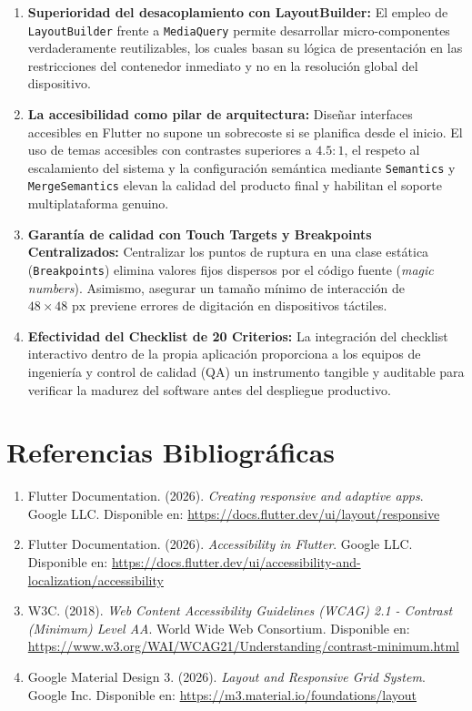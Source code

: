 \documentclass[12pt,a4paper]{article}
\begin{document}
\begin{enumerate}[leftmargin=*]
    \item \textbf{Superioridad del desacoplamiento con LayoutBuilder:} El empleo de \texttt{LayoutBuilder} frente a \texttt{MediaQuery} permite desarrollar micro-componentes verdaderamente reutilizables, los cuales basan su lógica de presentación en las restricciones del contenedor inmediato y no en la resolución global del dispositivo.
    \item \textbf{La accesibilidad como pilar de arquitectura:} Diseñar interfaces accesibles en Flutter no supone un sobrecoste si se planifica desde el inicio. El uso de temas accesibles con contrastes superiores a $4.5:1$, el respeto al escalamiento del sistema y la configuración semántica mediante \texttt{Semantics} y \texttt{MergeSemantics} elevan la calidad del producto final y habilitan el soporte multiplataforma genuino.
    \item \textbf{Garantía de calidad con Touch Targets y Breakpoints Centralizados:} Centralizar los puntos de ruptura en una clase estática (\texttt{Breakpoints}) elimina valores fijos dispersos por el código fuente (\textit{magic numbers}). Asimismo, asegurar un tamaño mínimo de interacción de $48\times 48\text{ px}$ previene errores de digitación en dispositivos táctiles.
    \item \textbf{Efectividad del Checklist de 20 Criterios:} La integración del checklist interactivo dentro de la propia aplicación proporciona a los equipos de ingeniería y control de calidad (QA) un instrumento tangible y auditable para verificar la madurez del software antes del despliegue productivo.
\end{enumerate}

\section{Referencias Bibliográficas}

\begin{enumerate}[leftmargin=*]
    \item Flutter Documentation. (2026). \textit{Creating responsive and adaptive apps}. Google LLC. Disponible en: \url{https://docs.flutter.dev/ui/layout/responsive}
    \item Flutter Documentation. (2026). \textit{Accessibility in Flutter}. Google LLC. Disponible en: \url{https://docs.flutter.dev/ui/accessibility-and-localization/accessibility}
    \item W3C. (2018). \textit{Web Content Accessibility Guidelines (WCAG) 2.1 - Contrast (Minimum) Level AA}. World Wide Web Consortium. Disponible en: \url{https://www.w3.org/WAI/WCAG21/Understanding/contrast-minimum.html}
    \item Google Material Design 3. (2026). \textit{Layout and Responsive Grid System}. Google Inc. Disponible en: \url{https://m3.material.io/foundations/layout}
\end{enumerate}
\end{document}
